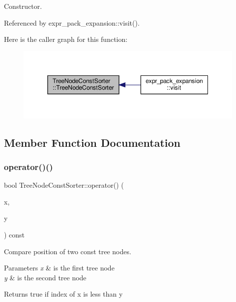 Constructor. 



Referenced by expr\+\_\+pack\+\_\+expansion\+::visit().

Here is the caller graph for this function\+:
\nopagebreak
\begin{figure}[H]
\begin{center}
\leavevmode
\includegraphics[width=345pt]{dd/d61/classTreeNodeConstSorter_aff59ff6b9361f9ba0d86860f9e525f98_icgraph}
\end{center}
\end{figure}


\subsection{Member Function Documentation}
\mbox{\label{classTreeNodeConstSorter_a42292eb5fe44085fd0653313cbb89bc0}} 
\subsubsection{\texorpdfstring{operator()()}{operator()()}}
{\footnotesize\ttfamily bool Tree\+Node\+Const\+Sorter\+::operator() (\begin{DoxyParamCaption}\item[{const \hyperlink{tree__node_8hpp_a3cf5d02292c940f3892425a5b5fdec3c}{tree\+\_\+node\+Const\+Ref} \&}]{x,  }\item[{const \hyperlink{tree__node_8hpp_a3cf5d02292c940f3892425a5b5fdec3c}{tree\+\_\+node\+Const\+Ref} \&}]{y }\end{DoxyParamCaption}) const}



Compare position of two const tree nodes. 


\begin{DoxyParams}{Parameters}
{\em x} & is the first tree node \\
\hline
{\em y} & is the second tree node \\
\hline
\end{DoxyParams}
\begin{DoxyReturn}{Returns}
true if index of x is less than y 
\end{DoxyReturn}


